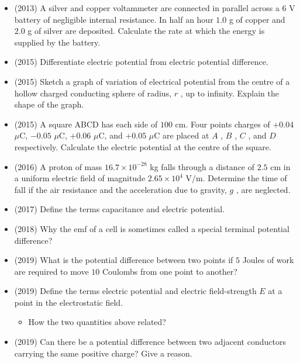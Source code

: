 \documentclass{article}
\begin{document}
\begin{itemize}
\item (2013)  A silver and copper voltammeter are connected in parallel across a $ 6$ V battery of negligible internal resistance. In half an hour $ 1.0$ g of copper and $ 2.0$ g of silver are deposited. Calculate the rate at which the energy is supplied by the battery. 
\item (2015)  Differentiate electric potential from electric potential difference.
\item (2015)  Sketch a graph of variation of electrical potential from the centre of a hollow charged conducting sphere of radius, $ r$ , up to infinity.  Explain the shape of the graph.
\item (2015)  A square ABCD has each side of $ 100$ cm.  Four points charges of $ +0.04$ $\mu$C, $ -0.05$ $\mu$C, $ +0.06$ $\mu$C, and $ +0.05$ $\mu$C are placed at $ A$ , $ B$ , $ C$ , and $ D$ respectively.  Calculate the electric potential at the centre of the square.
\item (2016)  A proton of mass $ 16.7 \times 10^{-28}$ kg falls through a distance of $ 2.5$ cm in a uniform electric field of magnitude $ 2.65 \times 10^{4}$ V$/$m.  Determine the time of fall if the air resistance and the acceleration due to gravity, $ g$ , are neglected.
\item (2017)  Define the terms capacitance and electric potential. 
\item (2018)  Why the emf of a cell is sometimes called a special terminal potential difference? 
\item (2019)  What is the potential difference between two points if $ 5$ Joules of work are required to move $ 10$ Coulombs from one point to another? 
\item (2019)  Define the terms electric potential and electric field-strength $ E$ at a point in the electrostatic field.
 \begin{itemize}
\item How the two quantities above related? 
\end{itemize}
\item (2019)  Can there be a potential difference between two adjacent conductors carrying the same positive charge? Give a reason. 
\end{itemize}
\end{document}
